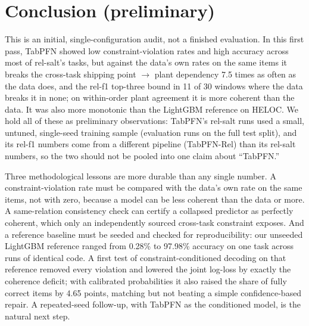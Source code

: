 \documentclass[11pt]{article}
\begin{document}
\section{Conclusion (preliminary)}

This is an initial, single-configuration audit, not a finished evaluation. In this first pass,
TabPFN showed low constraint-violation rates and high accuracy across most of rel-salt's
tasks, but against the data's own rates on the same items it breaks the cross-task shipping
point $\to$ plant dependency 7.5 times as often as the data does, and the rel-f1 top-three bound
in 11 of 30 windows where the data breaks it in none; on within-order plant agreement it is more
coherent than the data. It was also more monotonic than the LightGBM reference on HELOC. We hold
all of these as preliminary observations: TabPFN's rel-salt runs used a small, untuned,
single-seed training sample (evaluation runs on the full test split), and its rel-f1 numbers
come from a different pipeline (TabPFN-Rel) than its rel-salt numbers, so the two should not be
pooled into one claim about ``TabPFN.''

Three methodological lessons are more durable than any single number. A constraint-violation
rate must be compared with the data's own rate on the same items, not with zero, because a model
can be less coherent than the data or more. A same-relation consistency check can certify a
collapsed predictor as perfectly coherent, which only an independently sourced cross-task
constraint exposes. And a reference baseline must be seeded and checked for reproducibility:
our unseeded LightGBM reference ranged from 0.28\% to 97.98\% accuracy on one task across runs
of identical code. A first test of constraint-conditioned decoding on that reference removed
every violation and lowered the joint log-loss by exactly the coherence deficit; with calibrated
probabilities it also raised the share of fully correct items by 4.65 points, matching but not
beating a simple confidence-based repair. A repeated-seed follow-up, with TabPFN as the
conditioned model, is the natural next step.
\end{document}
